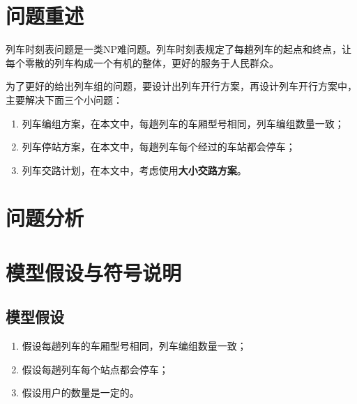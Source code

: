 \setcounter{page}{1}        %

%
%

\section{问题重述}

列车时刻表问题是一类NP难问题\cite{caoJiyuchengkedengdaishijiandechengshiguidaojiaotongliecheshikebiaoyouhuamoxingyusuanfayanjiu2021}。列车时刻表规定了每趟列车的起点和终点，让每个零散的列车构成一个有机的整体，更好的服务于人民群众。

为了更好的给出列车组的问题，要设计出列车开行方案，再设计列车开行方案中，主要解决下面三个小问题：

\begin{enumerate}
    \item 列车编组方案，在本文中，每趟列车的车厢型号相同，列车编组数量一致；
    \item 列车停站方案，在本文中，每趟列车每个经过的车站都会停车；
    \item 列车交路计划，在本文中，考虑使用\textbf{大小交路方案}。
\end{enumerate}

%
%
%

\section{问题分析}

%
%
%

\section{模型假设与符号说明}

\subsection{模型假设}

\begin{enumerate}
    \item 假设每趟列车的车厢型号相同，列车编组数量一致；
    \item 假设每趟列车每个站点都会停车；
    \item 假设用户的数量是一定的。
\end{enumerate}

